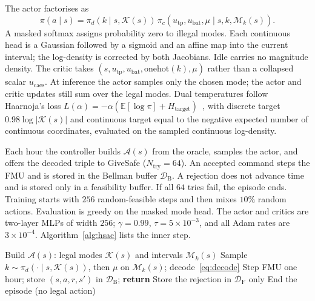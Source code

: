 \documentclass[conference]{IEEEtran}
\begin{document}
The actor factorises as
\begin{equation}
\pi(a\mid s)
=
\pi_d(k\mid s,\mathcal{K}(s))\,
\pi_c(u_{\mathrm{tp}},u_{\mathrm{bat}},\mu\mid s,k,\mathcal{M}_k(s)).
\label{eq:pi}
\end{equation}
A masked softmax assigns probability zero to illegal modes. Each continuous head is a Gaussian followed by a sigmoid and an affine map into the current interval; the log-density is corrected by both Jacobians. Idle carries no magnitude density. The critic takes \((s,u_{\mathrm{tp}},u_{\mathrm{bat}},\mathrm{onehot}(k),\mu)\) rather than a collapsed scalar \(u_{\mathrm{caes}}\). At inference the actor samples only the chosen mode; the actor and critic updates still sum over the legal modes. Dual temperatures follow Haarnoja's loss \(L(\alpha)=-\alpha(\mathbb{E}[\log\pi]+H_{\mathrm{target}})\)~\cite{haarnoja2018sac}, with discrete target \(0.98\log|\mathcal{K}(s)|\) and continuous target equal to the negative expected number of continuous coordinates, evaluated on the sampled continuous log-density.

Each hour the controller builds \(\mathcal{A}(s)\) from the oracle, samples the actor, and offers the decoded triple to GiveSafe (\(N_{\mathrm{try}}=64\)). An accepted command steps the FMU and is stored in the Bellman buffer \(\mathcal{D}_{\mathrm{B}}\). A rejection does not advance time and is stored only in a feasibility buffer. If all \(64\) tries fail, the episode ends. Training starts with \(256\) random-feasible steps and then mixes \(10\%\) random actions. Evaluation is greedy on the masked mode head. The actor and critics are two-layer MLPs of width \(256\); \(\gamma=0.99\), \(\tau=5\times 10^{-3}\), and all Adam rates are \(3\times 10^{-4}\). Algorithm~\ref{alg:hsac} lists the inner step.

\begin{algorithm}[H]
\caption{One-hour FS-HSAC step on the FMU}
\label{alg:hsac}
\begin{algorithmic}[1]
\State Build \(\mathcal{A}(s)\): legal modes \(\mathcal{K}(s)\) and intervals \(\mathcal{M}_k(s)\)
  \State Sample \(k\sim\pi_d(\cdot\mid s,\mathcal{K}(s))\), then \(\mu\) on \(\mathcal{M}_k(s)\); decode~\eqref{eq:decode}
    \State Step FMU one hour; store \((s,a,r,s')\) in \(\mathcal{D}_{\mathrm{B}}\); \textbf{return}
  \EndIf
  \State Store the rejection in \(\mathcal{D}_{\mathrm{F}}\) only
\EndFor
\State End the episode (no legal action)
\end{algorithmic}
\end{algorithm}
\FloatBarrier
\end{document}
